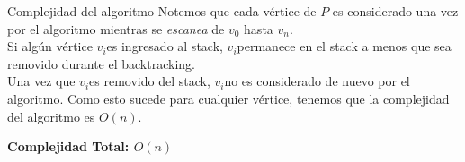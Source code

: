 \documentclass[aspectratio=169,xcolor=dvipsnames, t]{beamer}
\begin{document}

\begin{frame}{Complejidad del algoritmo}
  Notemos que cada vértice de $P$ es considerado una vez por el algoritmo mientras se \textit{escanea} de $v_{0}$ hasta $v_{n}$​.\\
  \vspace{0.5cm}
  Si algún vértice $v_{i}$​ es ingresado al stack, $v_{i}$​ permanece en el stack a menos que sea removido durante el backtracking.\\
  \vspace{0.5cm}
  Una vez que $v_{i}$​ es removido del stack, $v_{i}$​ no es considerado de nuevo por el algoritmo. Como esto sucede para cualquier vértice, tenemos que la complejidad del algoritmo es $O(n)$.
    \begin{center}
        \textbf{Complejidad Total: $O(n)$}
    \end{center}
\end{frame}



\makefinalpage
\end{document}

